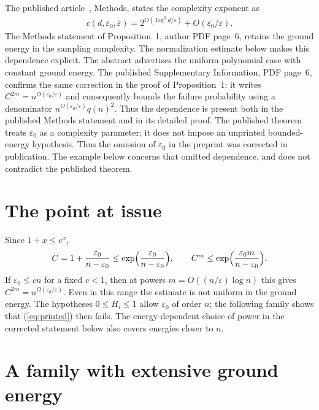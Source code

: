 \documentclass{article}
\begin{document}
The published article~\cite{Landau2015Published}, Methods, states the
complexity exponent as
\begin{align}
    c(d,\varepsilon_0,\varepsilon)
    =2^{O(\log^3d/\varepsilon)}+O(\varepsilon_0/\varepsilon).
    \label{eq:lvv_sampling_published_exponent}
\end{align}
The Methods statement of Proposition~1, author PDF page~6, retains the
ground energy in the sampling complexity. The normalization estimate below
makes this dependence explicit. The abstract advertises the uniform
polynomial case with constant ground energy.
The published Supplementary Information, PDF page~6, confirms the same
correction in the proof of Proposition~1: it writes
$C^{2m}=n^{O(\varepsilon_0/\varepsilon)}$ and consequently bounds the
failure probability using a denominator
$n^{O(\varepsilon_0/\varepsilon)}q(n)^2$.  Thus the dependence is present
both in the published Methods statement and in its detailed proof.
The published theorem treats $\varepsilon_0$ as a complexity parameter;
it does not impose an unprinted bounded-energy hypothesis. Thus the omission
of $\varepsilon_0$ in the preprint was corrected in publication. The example below concerns that omitted dependence, and does
not contradict the published theorem.

\section{The point at issue}

Since $1+x\le e^x$,
\begin{align*}
    C=1+\frac{\varepsilon_0}{n-\varepsilon_0}
    \le\exp\Bigl(\frac{\varepsilon_0}{n-\varepsilon_0}\Bigr),
    \qquad
    C^m\le\exp\Bigl(\frac{\varepsilon_0m}{n-\varepsilon_0}\Bigr).
\end{align*}
If $\varepsilon_0\le cn$ for a fixed $c<1$, then at powers
$m=O((n/\varepsilon)\log n)$ this gives
$C^{2m}=n^{O(\varepsilon_0/\varepsilon)}$. Even in this range the estimate
is not uniform in the ground energy. The hypotheses $0\le H_i\le1$
allow $\varepsilon_0$ of order $n$; the following family shows that
(\ref{eq:printed}) then fails. The energy-dependent choice of power in
the corrected statement below also covers energies closer to $n$.

\section{A family with extensive ground energy}
\end{document}
